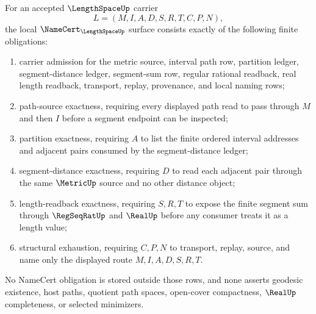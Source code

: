\begin{theorem}
\label{thm:length-space-namecert-obligation-surface}
For an accepted $\LengthSpaceUp$ carrier
$$
L=(M,I,A,D,S,R,T,C,P,N),
$$
the local $\NameCert_{\LengthSpaceUp}$ surface consists exactly of the following finite obligations:
\begin{enumerate}
\item carrier admission for the metric source, interval path row, partition ledger, segment-distance ledger, segment-sum row, regular rational readback, real length readback, transport, replay, provenance, and local naming rows;
\item path-source exactness, requiring every displayed path read to pass through $M$ and then $I$ before a segment endpoint can be inspected;
\item partition exactness, requiring $A$ to list the finite ordered interval addresses and adjacent pairs consumed by the segment-distance ledger;
\item segment-distance exactness, requiring $D$ to read each adjacent pair through the same $\MetricUp$ source and no other distance object;
\item length-readback exactness, requiring $S,R,T$ to expose the finite segment sum through $\RegSeqRatUp$ and $\RealUp$ before any consumer treats it as a length value;
\item structural exhaustion, requiring $C,P,N$ to transport, replay, source, and name only the displayed route $M,I,A,D,S,R,T$.
\end{enumerate}
No NameCert obligation is stored outside those rows, and none asserts geodesic existence, host paths, quotient path spaces, open-cover compactness, $\RealUp$ completeness, or selected minimizers.
\end{theorem}
